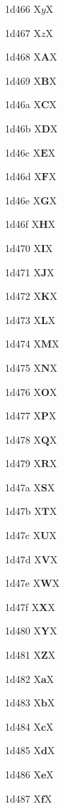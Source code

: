 \documentclass[11pt]{article}
\begin{document}
1d466 X{\ensuremath{\mathit{y}}}X

1d467 X{\ensuremath{\mathit{z}}}X

1d468 X{\ensuremath{\boldsymbol{A}}}X

1d469 X{\ensuremath{\boldsymbol{B}}}X

1d46a X{\ensuremath{\boldsymbol{C}}}X

1d46b X{\ensuremath{\boldsymbol{D}}}X

1d46c X{\ensuremath{\boldsymbol{E}}}X

1d46d X{\ensuremath{\boldsymbol{F}}}X

1d46e X{\ensuremath{\boldsymbol{G}}}X

1d46f X{\ensuremath{\boldsymbol{H}}}X

1d470 X{\ensuremath{\boldsymbol{I}}}X

1d471 X{\ensuremath{\boldsymbol{J}}}X

1d472 X{\ensuremath{\boldsymbol{K}}}X

1d473 X{\ensuremath{\boldsymbol{L}}}X

1d474 X{\ensuremath{\boldsymbol{M}}}X

1d475 X{\ensuremath{\boldsymbol{N}}}X

1d476 X{\ensuremath{\boldsymbol{O}}}X

1d477 X{\ensuremath{\boldsymbol{P}}}X

1d478 X{\ensuremath{\boldsymbol{Q}}}X

1d479 X{\ensuremath{\boldsymbol{R}}}X

1d47a X{\ensuremath{\boldsymbol{S}}}X

1d47b X{\ensuremath{\boldsymbol{T}}}X

1d47c X{\ensuremath{\boldsymbol{U}}}X

1d47d X{\ensuremath{\boldsymbol{V}}}X

1d47e X{\ensuremath{\boldsymbol{W}}}X

1d47f X{\ensuremath{\boldsymbol{X}}}X

1d480 X{\ensuremath{\boldsymbol{Y}}}X

1d481 X{\ensuremath{\boldsymbol{Z}}}X

1d482 X{\ensuremath{\boldsymbol{a}}}X

1d483 X{\ensuremath{\boldsymbol{b}}}X

1d484 X{\ensuremath{\boldsymbol{c}}}X

1d485 X{\ensuremath{\boldsymbol{d}}}X

1d486 X{\ensuremath{\boldsymbol{e}}}X

1d487 X{\ensuremath{\boldsymbol{f}}}X
\end{document}
